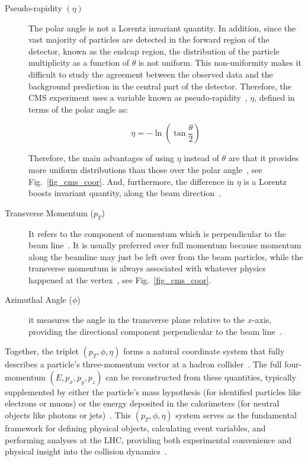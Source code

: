 \begin{description}
    \item[Pseudo-rapidity $(\eta)$] The polar angle is not a Lorentz invariant quantity. In addition, since the vast majority of particles are detected in the forward region of the detector, known as the endcap region, the distribution of the particle multiplicity as a function of $\theta$ is not uniform. This non-uniformity  makes it difficult to study the agreement between the observed data and the background prediction in the central part of the detector. Therefore, the CMS experiment uses a variable known as pseudo-rapidity~\cite{CMS:2008xjf,1674-1137-40-10-100001}, $\eta$, defined in terms of the polar angle as: 

    $$
    \eta=-\ln \left(\tan \frac{\theta}{2}\right)
    $$
    
    Therefore, the main advantages of using $\eta$ instead of $\theta$ are that it provides more  uniform distributions than those over the polar angle~\cite{CMS:PF2017}, see Fig.~\ref{fig_cms_coor}. And, furthermore, the difference in $\eta$ is a Lorentz boosts invariant quantity, along the beam direction~\cite{1674-1137-40-10-100001}.
    
    \item[Transverse Momentum ($p_T$)] It refers to the component of momentum which is perpendicular to the beam line~\cite{CMS:PF2017}. It is usually preferred over full momentum because momentum along the beamline may just be left over from the beam particles, while the transverse momentum is always associated with whatever physics happened at the vertex~\cite{CMS:PF2017}, see Fig.~\ref{fig_cms_coor}.
    
    \item[Azimuthal Angle ($\phi$)] it measures the angle in the transverse plane relative to the $x$-axis, providing the directional component perpendicular to the beam line~\cite{CMS:2008xjf}.
\end{description}

Together, the triplet $(p_T, \phi, \eta)$ forms a natural coordinate system that fully describes a particle's three-momentum vector at a hadron collider~\cite{CMS:PF2017,1674-1137-40-10-100001}. The full four-momentum $(E, p_x, p_y, p_z)$ can be reconstructed from these quantities, typically supplemented by either the particle's mass hypothesis (for identified particles like electrons or muons) or the energy deposited in the calorimeters (for neutral objects like photons or jets)~\cite{CMS_EGM_17001,CMS_MUON_17001,Cacciari:2011ma}. This $(p_T, \phi, \eta)$ system serves as the fundamental framework for defining physical objects, calculating event variables, and performing analyses at the LHC, providing both experimental convenience and physical insight into the collision dynamics~\cite{CMS:PF2017,Cacciari:2011ma}.

